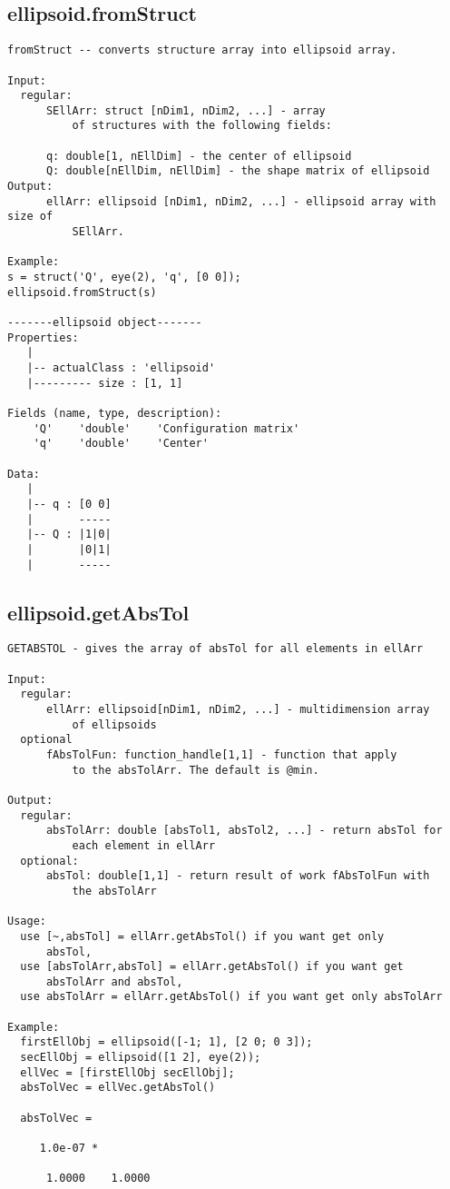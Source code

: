 \subsection{\texorpdfstring{ellipsoid.fromStruct}{fromStruct}}\label{method:ellipsoid.fromStruct}
\begin{verbatim}
fromStruct -- converts structure array into ellipsoid array.

Input:
  regular:
      SEllArr: struct [nDim1, nDim2, ...] - array
          of structures with the following fields:

      q: double[1, nEllDim] - the center of ellipsoid
      Q: double[nEllDim, nEllDim] - the shape matrix of ellipsoid
Output:
      ellArr: ellipsoid [nDim1, nDim2, ...] - ellipsoid array with size of
          SEllArr.

Example:
s = struct('Q', eye(2), 'q', [0 0]);
ellipsoid.fromStruct(s)

-------ellipsoid object-------
Properties:
   |
   |-- actualClass : 'ellipsoid'
   |--------- size : [1, 1]

Fields (name, type, description):
    'Q'    'double'    'Configuration matrix'
    'q'    'double'    'Center'

Data:
   |
   |-- q : [0 0]
   |       -----
   |-- Q : |1|0|
   |       |0|1|
   |       -----
\end{verbatim}
\subsection{\texorpdfstring{ellipsoid.getAbsTol}{getAbsTol}}\label{method:ellipsoid.getAbsTol}
\begin{verbatim}
GETABSTOL - gives the array of absTol for all elements in ellArr

Input:
  regular:
      ellArr: ellipsoid[nDim1, nDim2, ...] - multidimension array
          of ellipsoids
  optional
      fAbsTolFun: function_handle[1,1] - function that apply
          to the absTolArr. The default is @min.

Output:
  regular:
      absTolArr: double [absTol1, absTol2, ...] - return absTol for
          each element in ellArr
  optional:
      absTol: double[1,1] - return result of work fAbsTolFun with
          the absTolArr

Usage:
  use [~,absTol] = ellArr.getAbsTol() if you want get only
      absTol,
  use [absTolArr,absTol] = ellArr.getAbsTol() if you want get
      absTolArr and absTol,
  use absTolArr = ellArr.getAbsTol() if you want get only absTolArr

Example:
  firstEllObj = ellipsoid([-1; 1], [2 0; 0 3]);
  secEllObj = ellipsoid([1 2], eye(2));
  ellVec = [firstEllObj secEllObj];
  absTolVec = ellVec.getAbsTol()

  absTolVec =

     1.0e-07 *

      1.0000    1.0000
\end{verbatim}
